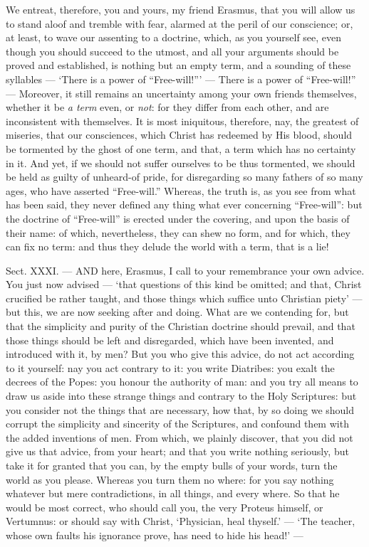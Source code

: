 We entreat, therefore, you and yours, my friend Erasmus, that you will allow us to stand aloof and tremble with fear, alarmed at the peril of our conscience; or, at least, to wave our assenting to a doctrine, which, as you yourself see, even though you should succeed to the utmost, and all your arguments should be proved and established, is nothing but an empty term, and a sounding of these syllables — ‘There is a power of “Free-will!”’ — There is a power of “Free-will!” — Moreover, it still remains an uncertainty among your own friends themselves, whether it be \emph{a term }even, or \emph{not}: for they differ from each other, and are inconsistent with themselves. It is most iniquitous, therefore, nay, the greatest of miseries, that our consciences, which Christ has redeemed by His blood, should be tormented by the ghost of one term, and that, a term which has no certainty in it. And yet, if we should not suffer ourselves to be thus tormented, we should be held as guilty of unheard-of pride, for disregarding so many fathers of so many ages, who have asserted “Free-will.” Whereas, the truth is, as you see from what has been said, they never defined any thing what ever concerning “Free-will”: but the doctrine of “Free-will” is erected under the covering, and upon the basis of their name: of which, nevertheless, they can shew no form, and for which, they can fix no term: and thus they delude the world with a term, that is a lie!


Sect. XXXI. — AND here, Erasmus, I call to your remembrance your own advice. You just now advised — ‘that questions of this kind be omitted; and that, Christ crucified be rather taught, and those things which suffice unto Christian piety’ — but this, we are now seeking after and doing. What are we contending for, but that the simplicity and purity of the Christian doctrine should prevail, and that those things should be left and disregarded, which have been invented, and introduced with it, by men? But you who give this advice, do not act according to it yourself: nay you act contrary to it: you write Diatribes: you exalt the decrees of the Popes: you honour the authority of man: and you try all means to draw us aside into these strange things and contrary to the Holy Scriptures: but you consider not the things that are necessary, how that, by so doing we should corrupt the simplicity and sincerity of the Scriptures, and confound them with the added inventions of men. From which, we plainly discover, that you did not give us that advice, from your heart; and that you write nothing seriously, but take it for granted that you can, by the empty bulls of your words, turn the world as you please. Whereas you turn them no where: for you say nothing whatever but mere contradictions, in all things, and every where. So that he would be most correct, who should call you, the very Proteus himself, or Vertumnus: or should say with Christ, ‘Physician, heal thyself.’ — ‘The teacher, whose own faults his ignorance prove, has need to hide his head!’ —

